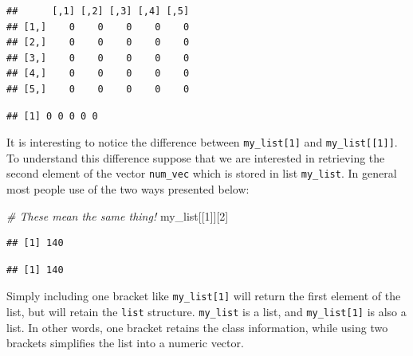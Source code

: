 \documentclass[12pt,]{krantz}
\newenvironment{Shaded}{\begin{snugshade}}{\end{snugshade}}
\newcommand{\DecValTok}[1]{\textcolor[rgb]{0.06,0.06,0.06}{#1}}
\newcommand{\CommentTok}[1]{\textcolor[rgb]{0.37,0.37,0.37}{\textit{#1}}}
\newcommand{\OperatorTok}[1]{\textcolor[rgb]{0.43,0.43,0.43}{\textbf{#1}}}
\newcommand{\NormalTok}[1]{#1}
\begin{document}
\begin{verbatim}
##      [,1] [,2] [,3] [,4] [,5]
## [1,]    0    0    0    0    0
## [2,]    0    0    0    0    0
## [3,]    0    0    0    0    0
## [4,]    0    0    0    0    0
## [5,]    0    0    0    0    0
\end{verbatim}

\begin{Shaded}
\end{Shaded}

\begin{verbatim}
## [1] 0 0 0 0 0
\end{verbatim}

It is interesting to notice the difference between
\texttt{my\_list{[}1{]}} and \texttt{my\_list{[}{[}1{]}{]}}. To
understand this difference suppose that we are interested in retrieving
the second element of the vector \texttt{num\_vec} which is stored in
list \texttt{my\_list}. In general most people use of the two ways
presented below:

\begin{Shaded}
\begin{Highlighting}[]
\CommentTok{# These mean the same thing! }
\NormalTok{my_list[[}\DecValTok{1}\NormalTok{]][}\DecValTok{2}\NormalTok{]}
\end{Highlighting}
\end{Shaded}

\begin{verbatim}
## [1] 140
\end{verbatim}

\begin{Shaded}
\end{Shaded}

\begin{verbatim}
## [1] 140
\end{verbatim}

Simply including one bracket like \texttt{my\_list{[}1{]}} will return
the first element of the list, but will retain the \texttt{list}
structure. \texttt{my\_list} is a list, and \texttt{my\_list{[}1{]}} is
also a list. In other words, one bracket retains the class information,
while using two brackets simplifies the list into a numeric vector.
\end{document}
